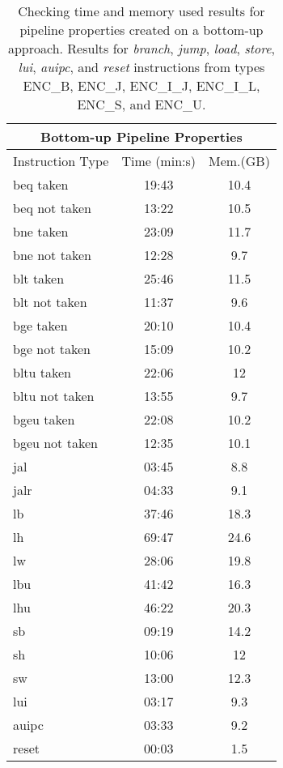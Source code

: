 \begin{table*}[htb!] 
	\centering 
	\caption{Checking time and memory used results for pipeline properties created on a bottom-up approach. Results for \textit{branch}, \textit{jump}, \textit{load}, \textit{store}, \textit{lui}, \textit{auipc}, and \textit{reset} instructions from types ENC\_B, ENC\_J, ENC\_I\_J, ENC\_I\_L, ENC\_S, and ENC\_U.} 
	\label{tab:bottom-up-check-resutls-others}
		\begin{tabular}{p{4cm}cc}
          \multicolumn{3}{c}{\textbf{Bottom-up Pipeline Properties}} \\
          \hline
         Instruction Type & Time (min:s) & Mem.(GB)  \\
          \hline
        beq taken    & 19:43 & 10.4 \\
        beq not taken     & 13:22 & 10.5 \\
        bne taken    & 23:09 & 11.7 \\
        bne not taken    & 12:28 & 9.7 \\
        blt taken    & 25:46 & 11.5 \\
        blt not taken    & 11:37 & 9.6 \\
        bge taken    & 20:10 & 10.4 \\
        bge not taken    & 15:09 & 10.2 \\
        bltu taken    & 22:06 & 12 \\
        bltu not taken    & 13:55 & 9.7 \\
        bgeu taken    & 22:08 & 10.2 \\
        bgeu not taken    & 12:35 & 10.1 \\
        jal    & 03:45 & 8.8 \\
        jalr    & 04:33 & 9.1 \\
        lb    & 37:46 & 18.3 \\
        lh    & 69:47 & 24.6 \\
        lw    & 28:06 & 19.8 \\
        lbu    & 41:42 & 16.3 \\
        lhu    & 46:22 & 20.3 \\
        sb    & 09:19 & 14.2 \\
        sh    & 10:06 & 12 \\
        sw    & 13:00 & 12.3 \\
        lui    & 03:17 & 9.3 \\
        auipc    & 03:33 & 9.2 \\
        reset    & 00:03 & 1.5 \\
\end{tabular}
\end{table*}

